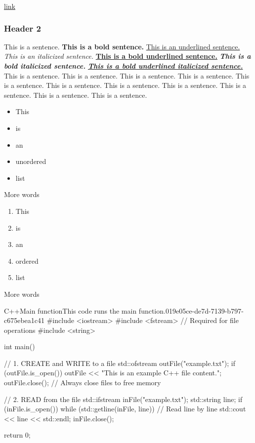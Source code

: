 \underline{\hyperref[019e05ce-de7d-7b4e-b241-d219df716916]{link}}

\subsubsection{Header 2}

This is a sentence. \textbf{This is a bold sentence.} \underline{This is an underlined sentence.} \textit{This is an italicized sentence.} \underline{\textbf{This is a bold underlined sentence.}}\textbf{ }\textit{\textbf{This is a bold italicized sentence.}} \underline{\textit{\textbf{This is a bold underlined italicized sentence.}}} This is a sentence. This is a sentence. This is a sentence. This is a sentence. This is a sentence. This is a sentence. This is a sentence. This is a sentence. This is a sentence. This is a sentence. This is a sentence.

\begin{itemize}
  \item This
  \item is
  \item an
  \item unordered
  \item list
\end{itemize}

More words

\begin{enumerate}
  \item This
  \item is
  \item an
  \item ordered
  \item list
\end{enumerate}

More words

\begin{notebookcodeblock}{C++}{Main function}{This code runs the main function.}{019e05ce-de7d-7139-b797-c675ebea1c41}
#include <iostream>
#include <fstream> // Required for file operations
#include <string>

int main() {
    // 1. CREATE and WRITE to a file
    std::ofstream outFile("example.txt"); 
    if (outFile.is_open()) {
        outFile << "This is an example C++ file content.\n";
        outFile.close(); // Always close files to free memory
    }

    // 2. READ from the file
    std::ifstream inFile("example.txt");
    std::string line;
    if (inFile.is_open()) {
        while (std::getline(inFile, line)) { // Read line by line
            std::cout << line << std::endl;
        }
        inFile.close();
    }

    return 0;
}
\end{notebookcodeblock}

